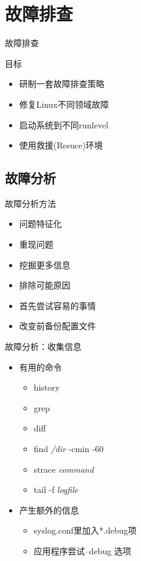 \section{故障排查}

\begin{frame}{故障排查}

目标
\begin{itemize}
\item 研制一套故障排查策略
\item 修复Linux不同领域故障
\item 启动系统到不同runlevel
\item 使用救援(Resuce)环境
\end{itemize}
\end{frame} 

\subsection{故障分析}



\begin{frame}{故障分析方法}
\begin{itemize}
\item 问题特征化
\item 重现问题
\item 挖掘更多信息
\item 排除可能原因
\item 首先尝试容易的事情
\item 改变前备份配置文件
\end{itemize}

\end{frame} 
\begin{frame}{故障分析：收集信息}
\begin{itemize}
\item 有用的命令

\begin{itemize}
\item history 
\item grep
\item diff
\item find \emph{/dir} -cmin -60
\item strace \emph{command }
\item tail -f \emph{logfile}
\end{itemize}
\item 产生额外的信息

\begin{itemize}
\item syslog.conf里加入{*}.debug项
\item 应用程序尝试--debug 选项
\end{itemize}
\end{itemize}
\end{frame} 

